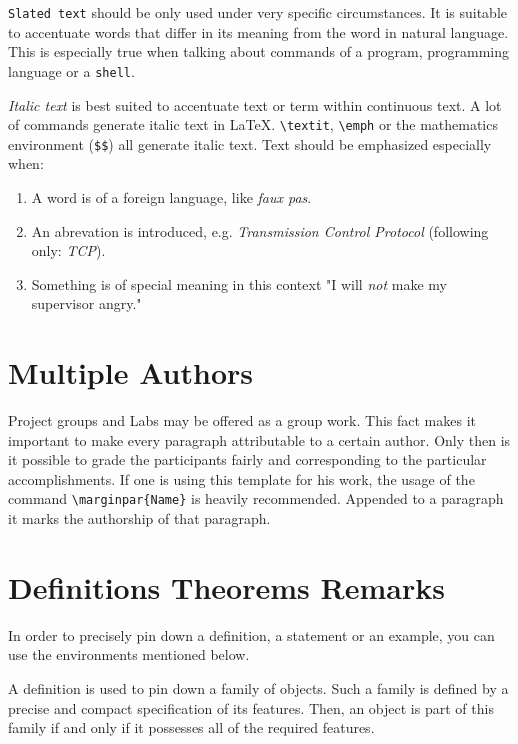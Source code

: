 \texttt{Slated text} should be only used under very specific circumstances.
It is suitable to accentuate words that differ in its meaning from the word
in natural language.
This is especially true when talking about commands of a program, programming
language or a \texttt{shell}.

\textit{Italic text} is best suited to accentuate text or term within
continuous text.
A lot of commands generate italic text in LaTeX.
\verb+\textit+, \verb+\emph+ or the mathematics environment (\verb+$$+) all
generate italic text.
Text should be emphasized especially when:

  \begin{enumerate}
    \item A word is of a foreign language, like \emph{faux pas}.
    \item An abrevation is introduced, e.g. \emph{Transmission Control Protocol} (following only: \emph{TCP}).
    \item Something is of special meaning in this context "I will \emph{not}
    make my supervisor angry."
  \end{enumerate}

\section{Multiple Authors}
Project groups and Labs may be offered as a group work.
This fact makes it important to make every paragraph attributable to a certain
author.
Only then is it possible to grade the participants fairly and corresponding to
the particular accomplishments.
If one is using this template for his work, the usage of the command
\verb+\marginpar{Name}+ is heavily recommended.
Appended to a paragraph it marks the authorship of that paragraph.

\section{Definitions Theorems Remarks}
In order to precisely pin down a definition, a statement or an example, you can use the environments mentioned below.

\begin{definition}
  A definition is used to pin down a family of objects.
  Such a family is defined by a precise and compact specification of its features.
  Then, an object is part of this family if and only if it possesses all of the required features.
\end{definition}


